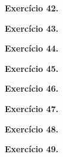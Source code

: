 \documentclass[12pt,a4paper]{article}
\begin{document}
\vspace{0.5cm}
\noindent\textbf{Exercício 42.}

\vspace{0.5cm}
\noindent\textbf{Exercício 43.}

\vspace{0.5cm}
\noindent\textbf{Exercício 44.}

\vspace{0.5cm}
\noindent\textbf{Exercício 45.}

\vspace{0.5cm}
\noindent\textbf{Exercício 46.}

\vspace{0.5cm}
\noindent\textbf{Exercício 47.}

\vspace{0.5cm}
\noindent\textbf{Exercício 48.}

\vspace{0.5cm}
\noindent\textbf{Exercício 49.}
\end{document}
